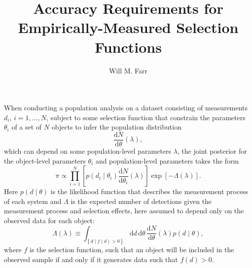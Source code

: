 \documentclass[modern]{aastex62}
\newcommand{\dd}{\mathrm{d}}
\newcommand{\diff}[2]{\frac{\dd #1}{\dd #2}}
\begin{document}
\title{Accuracy Requirements for Empirically-Measured Selection Functions}

\author[0000-0003-1540-8562]{Will M. Farr}

\maketitle

When conducting a population analysis on a dataset consisting of measurements
$d_i$, $i = 1, \ldots, N$, subject to some selection function that constrain the
parameters $\theta_i$ of a set of $N$ objects to infer the population
distribution
%
\begin{equation}
  \diff{N}{\theta}\left( \lambda \right),
\end{equation}
%
which can depend on some population-level parameters $\lambda$, the joint
posterior for the object-level parameters $\theta_i$ and population-level
parameters takes the form \citep{Loredo2004,Mandel2018}
%
\begin{equation}
\pi \propto \prod_{i=1}^N \left[ p\left( d_i \mid \theta_i \right) \diff{N}{\theta_i}\left( \lambda \right) \right] \exp\left[ - \Lambda\left( \lambda \right) \right].
\end{equation}
%
Here $p\left( d \mid \theta\right)$ is the likelihood function that describes
the measurement process of each system and $\Lambda$ is the expected number of
detections given the measurement process and selection effects, here assumed to
depend only on the observed data for each object:
\begin{equation}
  \Lambda\left( \lambda \right) \equiv \int_{\left\{ d \mid f(d) > 0 \right\}} \dd d \, \dd \theta \, \diff{N}{\theta}\left( \lambda \right) p\left( d \mid \theta \right),
\end{equation}
where $f$ is the selection function, such that an object will be included in the observed sample if and only if it generates data such that $f(d) > 0$.


\end{document}
